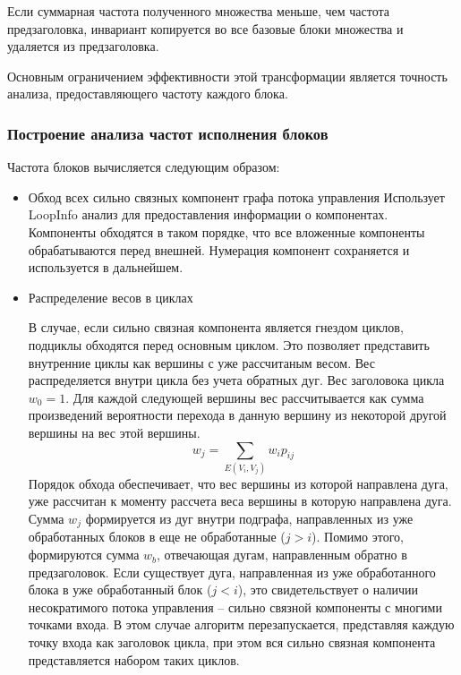 Если суммарная частота полученного множества меньше, чем частота предзаголовка, инвариант копируется во все базовые блоки множества и удаляется из предзаголовка.

Основным ограничением эффективности этой трансформации является точность анализа, предоставляющего частоту каждого блока.

\subsubsection{Построение анализа частот исполнения блоков}

Частота блоков вычисляется следующим образом:
\begin{itemize}
    \item{Обход всех сильно связных компонент графа потока управления}
        Использует LoopInfo анализ для предоставления информации о компонентах.
        Компоненты обходятся в таком порядке, что все вложенные компоненты обрабатываются перед внешней.
        Нумерация компонент сохраняется и используется в дальнейшем.

    \item{Распределение весов в циклах}

        В случае, если сильно связная компонента является гнездом циклов, подциклы обходятся перед основным циклом.
        Это позволяет представить внутренние циклы как вершины с уже рассчитаным весом.
        Вес распределяется внутри цикла без учета обратных дуг.
        Вес заголовока цикла $w_0 = 1$. Для каждой следующей вершины вес рассчитывается как сумма произведений вероятности перехода в данную вершину из некоторой другой вершины на вес этой вершины.
        $$ w_j = \sum_{E(V_i, V_j)} w_i p_{ij} $$
        Порядок обхода обеспечивает, что вес вершины из которой направлена дуга, уже рассчитан к моменту рассчета веса вершины в которую направлена дуга.
        Сумма $ w_j $ формируется из дуг внутри подграфа, направленных из уже обработанных блоков в еще не обработанные ($j > i$).
        Помимо этого, формируются сумма $ w_b $, отвечающая дугам, направленным обратно в предзаголовок.
        Если существует дуга, направленная из уже обработанного блока в уже обработанный блок ($ j < i $), это свидетельствует о наличии несократимого потока управления -- сильно связной компоненты с многими точками входа.
        В этом случае алгоритм перезапускается, представляя каждую точку входа как заголовок цикла, при этом вся сильно связная компонента представляется набором таких циклов.


\end{itemize}
